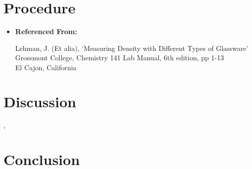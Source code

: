 \documentclass[fleqn,titlepage]{article}
\begin{document}
\section*{Procedure}
\begin{itemize}
  \item  \textbf{Referenced From:} \\
    \begin{addmargin}[1em]{1em}
      Lehman, J. (Et alia), `Measuring Density with Different Types of Glassware' \\
      Grossmont College, Chemistry 141 Lab Manual, 6th edition, pp 1-13 \\
      El Cajon, California
    \end{addmargin}
\end{itemize}

\section*{Discussion}
  \paragraph{}
, 
\section*{Conclusion}
  \paragraph{} 
\end{document}
